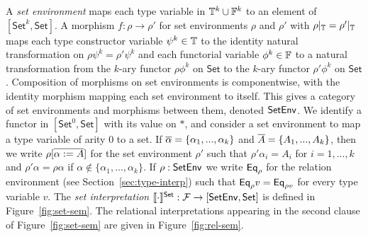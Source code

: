 \documentclass[runningheads]{llncs}
\newcommand{\set}{\mathsf{Set}}
\newcommand{\F}{\mathcal{F}}
\begin{document}
A {\em set environment} maps each type variable in $\mathbb{T}^k \cup
\mathbb{F}^k$ to an element of $[\set^k,\set]$.  A morphism $f : \rho \to
\rho'$ for set environments $\rho$ and $\rho'$ with $\rho|_{\mathbb{T}} =
\rho'|_{\mathbb{T}}$ maps each type constructor variable $\psi^k \in \mathbb{T}$
to the identity natural transformation on $\rho \psi^k = \rho'\psi^k$
and each functorial variable $\phi^k \in \mathbb{F}$ to a natural
transformation from the $k$-ary functor $\rho \phi^k$ on $\set$ to the
$k$-ary functor $\rho' \phi^k$ on $\set$.  Composition of morphisms on
set environments is componentwise, with the identity morphism mapping
each set environment to itself. This gives a category of set
environments and morphisms between them, denoted $\mathsf{SetEnv}$.
We identify a functor in $[\set^0, \set]$ with its value on $\ast$,
and consider a set environment to map a type variable of arity $0$ to
a set.  If $\overline{\alpha} = \{\alpha_1,...,\alpha_k\}$ and $\overline{A} =
\{A_1,...,A_k\}$, then we write $\rho[\overline{\alpha := A}]$ for the set
environment $\rho'$ such that $\rho' \alpha_i = A_i$ for $i = 1,...,k$
and $\rho' \alpha = \rho \alpha$ if $\alpha \not \in
\{\alpha_1,...,\alpha_k\}$.  If $\rho : \mathsf{SetEnv}$ we write
$\mathsf{Eq}_\rho$ for the relation environment (see Section~\ref{sec:type-interp})
such that $\mathsf{Eq}_\rho v = \mathsf{Eq}_{\rho v}$ for every type variable $v$.
The {\em set interpretation} $\setsem{\cdot} : \F \to [\setenv, \set]$
is defined in Figure~\ref{fig:set-sem}.
The relational interpretations appearing in the second clause of
Figure~\ref{fig:set-sem} are given in Figure~\ref{fig:rel-sem}.

\end{document}
